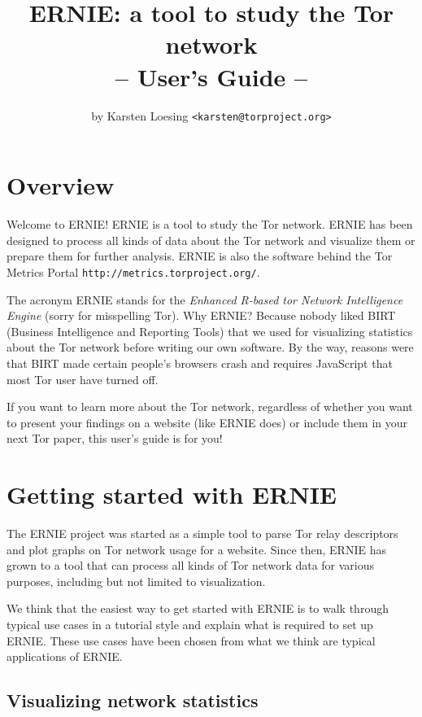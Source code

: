 \documentclass{article}
\begin{document}
\title{ERNIE: a tool to study the Tor network\\-- User's Guide --}
\author{by Karsten Loesing \texttt{<karsten@torproject.org>}}
\maketitle

\section{Overview}

Welcome to ERNIE!
ERNIE is a tool to study the Tor network.
ERNIE has been designed to process all kinds of data about the Tor network
and visualize them or prepare them for further analysis.
ERNIE is also the software behind the Tor Metrics Portal
\verb+http://metrics.torproject.org/+.

The acronym ERNIE stands for the \emph{Enhanced R-based tor Network
Intelligence Engine} (sorry for misspelling Tor).
Why ERNIE?
Because nobody liked BIRT (Business Intelligence and Reporting Tools) that
we used for visualizing statistics about the Tor network before writing
our own software.
By the way, reasons were that BIRT made certain people's browsers crash
and requires JavaScript that most Tor user have turned off.

If you want to learn more about the Tor network, regardless of whether you
want to present your findings on a website (like ERNIE does) or include
them in your next Tor paper, this user's guide is for you!

\section{Getting started with ERNIE}

The ERNIE project was started as a simple tool to parse Tor relay
descriptors and plot graphs on Tor network usage for a website.
Since then, ERNIE has grown to a tool that can process all kinds of Tor
network data for various purposes, including but not limited to
visualization.

We think that the easiest way to get started with ERNIE is to walk through
typical use cases in a tutorial style and explain what is required to set
up ERNIE.
These use cases have been chosen from what we think are typical
applications of ERNIE.

\subsection{Visualizing network statistics}
\end{document}
